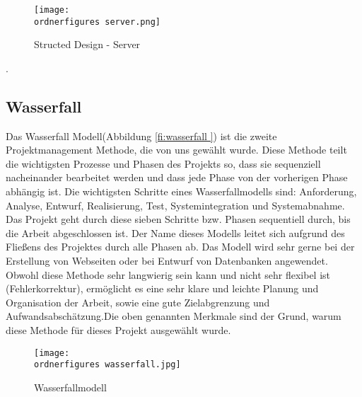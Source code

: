 \label{fi:sd-server }

\begin{figure}[h]
	\centering
	\texttt{[image: \\ordnerfigures
		server.png]}
	\caption{Structed Design - Server}
\end{figure}


.\subsection{Wasserfall}
Das Wasserfall Modell(Abbildung \ref{fi:wasserfall }) ist die zweite Projektmanagement Methode, die von uns gew\"{a}hlt wurde. Diese Methode teilt die wichtigsten Prozesse und Phasen des Projekts so, dass sie sequenziell nacheinander bearbeitet werden und dass jede Phase von der vorherigen Phase abh\"{a}ngig ist. Die wichtigsten Schritte eines Wasserfallmodells sind: Anforderung, Analyse, Entwurf, Realisierung, Test, Systemintegration und Systemabnahme. Das Projekt geht durch diese sieben Schritte bzw. Phasen sequentiell durch, bis die Arbeit abgeschlossen ist. Der Name dieses Modells leitet sich aufgrund des Flie\ss{}ens des Projektes durch alle Phasen ab.  Das Modell wird sehr gerne bei der Erstellung von Webseiten oder bei Entwurf von Datenbanken angewendet. Obwohl diese Methode sehr langwierig sein kann und nicht sehr flexibel ist (Fehlerkorrektur), erm\"{o}glicht es eine sehr klare und leichte Planung und Organisation der Arbeit, sowie eine gute Zielabgrenzung und Aufwandsabsch\"{a}tzung.Die oben genannten Merkmale sind der Grund, warum diese Methode f\"{u}r dieses Projekt ausgew\"{a}hlt wurde. 

\label{fi:wasserfall }

\begin{figure}[h]
	\centering
	\texttt{[image: \\ordnerfigures
		wasserfall.jpg]}
	\caption{Wasserfallmodell}
\end{figure}



